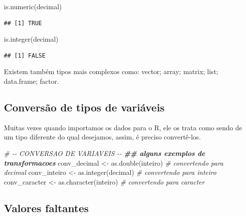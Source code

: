 \documentclass[
]{book}
\newenvironment{Shaded}{\begin{snugshade}}{\end{snugshade}}
\newcommand{\CommentTok}[1]{\textcolor[rgb]{0.56,0.35,0.01}{\textit{#1}}}
\newcommand{\DocumentationTok}[1]{\textcolor[rgb]{0.56,0.35,0.01}{\textbf{\textit{#1}}}}
\newcommand{\FunctionTok}[1]{\textcolor[rgb]{0.00,0.00,0.00}{#1}}
\newcommand{\NormalTok}[1]{#1}
\newcommand{\OtherTok}[1]{\textcolor[rgb]{0.56,0.35,0.01}{#1}}
\begin{document}
\begin{Shaded}
\begin{Highlighting}[]
\FunctionTok{is.numeric}\NormalTok{(decimal)}
\end{Highlighting}
\end{Shaded}

\begin{verbatim}
## [1] TRUE
\end{verbatim}

\begin{Shaded}
\begin{Highlighting}[]
\FunctionTok{is.integer}\NormalTok{(decimal)}
\end{Highlighting}
\end{Shaded}

\begin{verbatim}
## [1] FALSE
\end{verbatim}

Existem também tipos mais complexos como: vector; array; matrix; list; data.frame;
factor.

\hypertarget{conversuxe3o-de-tipos-de-variuxe1veis}{%
\subsection{Conversão de tipos de variáveis}\label{conversuxe3o-de-tipos-de-variuxe1veis}}

Muitas vezes quando importamos os dados para o R, ele os trata como sendo de um tipo diferente do qual desejamos, assim, é preciso convertê-los.

\begin{Shaded}
\begin{Highlighting}[]
\CommentTok{\# {-}{-} CONVERSAO DE VARIAVEIS {-}{-}}
\DocumentationTok{\#\# alguns exemplos de transformacoes}
\NormalTok{conv\_decimal }\OtherTok{\textless{}{-}} \FunctionTok{as.double}\NormalTok{(inteiro) }\CommentTok{\# convertendo para decimal}
\NormalTok{conv\_inteiro }\OtherTok{\textless{}{-}} \FunctionTok{as.integer}\NormalTok{(decimal) }\CommentTok{\# convertendo para inteiro}
\NormalTok{conv\_caracter }\OtherTok{\textless{}{-}} \FunctionTok{as.character}\NormalTok{(inteiro) }\CommentTok{\# convertendo para caracter}
\end{Highlighting}
\end{Shaded}

\hypertarget{valores-faltantes}{%
\subsection{Valores faltantes}\label{valores-faltantes}}
\end{document}
